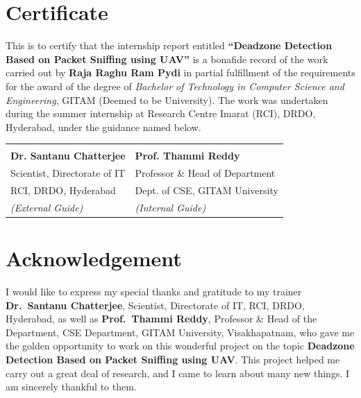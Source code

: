 \chapter*{Certificate}
\thispagestyle{plain}

\noindent This is to certify that the internship report entitled
\textbf{``Deadzone Detection Based on Packet Sniffing using UAV''}
is a bonafide record of the work carried out by
\textbf{Raja Raghu Ram Pydi} in partial fulfillment of the requirements for the
award of the degree of \emph{Bachelor of Technology in Computer Science and
Engineering}, GITAM (Deemed to be University). The work was undertaken during the
summer internship at Research Centre Imarat (RCI), DRDO, Hyderabad, under the
guidance named below.

\vspace{2.2cm}
\noindent
\begin{tabularx}{\textwidth}{@{}X X@{}}
\hrulefill & \hrulefill \\[2pt]
\textbf{Dr. Santanu Chatterjee} & \textbf{Prof. Thammi Reddy} \\
Scientist, Directorate of IT & Professor \& Head of Department \\
RCI, DRDO, Hyderabad & Dept. of CSE, GITAM University \\
\emph{(External Guide)} & \emph{(Internal Guide)} \\
\end{tabularx}

\chapter*{Acknowledgement}
\thispagestyle{plain}

\noindent I would like to express my special thanks and gratitude to my trainer
\textbf{Dr.~Santanu Chatterjee}, Scientist, Directorate of IT, RCI, DRDO,
Hyderabad, as well as \textbf{Prof.~Thammi Reddy}, Professor \& Head of the
Department, CSE Department, GITAM University, Visakhapatnam, who gave me the
golden opportunity to work on this wonderful project on the topic
\textbf{Deadzone Detection Based on Packet Sniffing using UAV}. This project
helped me carry out a great deal of research, and I came to learn about many new
things. I am sincerely thankful to them.

